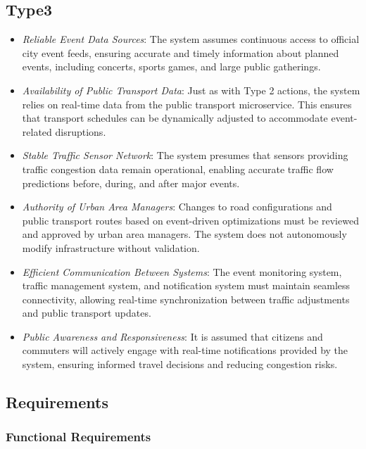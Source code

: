 \documentclass[a4paper,12pt]{article}
\begin{document}
\subsection*{Type3}
\begin{itemize}
    \item \textit{Reliable Event Data Sources}: The system assumes continuous access to official city event feeds, ensuring accurate and timely information about planned events, including concerts, sports games, and large public gatherings.
    \item \textit{Availability of Public Transport Data}: Just as with Type 2 actions, the system relies on real-time data from the public transport microservice. This ensures that transport schedules can be dynamically adjusted to accommodate event-related disruptions.
    \item \textit{Stable Traffic Sensor Network}: The system presumes that sensors providing traffic congestion data remain operational, enabling accurate traffic flow predictions before, during, and after major events.
    \item \textit{Authority of Urban Area Managers}: Changes to road configurations and public transport routes based on event-driven optimizations must be reviewed and approved by urban area managers. The system does not autonomously modify infrastructure without validation.
    \item \textit{Efficient Communication Between Systems}: The event monitoring system, traffic management system, and notification system must maintain seamless connectivity, allowing real-time synchronization between traffic adjustments and public transport updates.
    \item \textit{Public Awareness and Responsiveness}: It is assumed that citizens and commuters will actively engage with real-time notifications provided by the system, ensuring informed travel decisions and reducing congestion risks.
\end{itemize}

\newpage

\subsection{Requirements}
\subsubsection{Functional Requirements}
\end{document}
